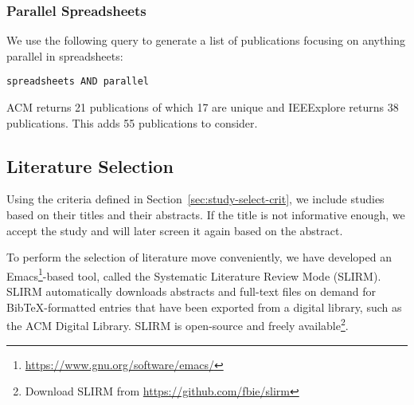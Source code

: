 \documentclass[a4paper]{article}
\begin{document}
\subsubsection{Parallel Spreadsheets}

We use the following query to generate a list of publications focusing on anything parallel in spreadsheets:

\begin{lstlisting}
spreadsheets AND parallel
\end{lstlisting}

\noindent ACM returns 21 publications of which 17 are unique and IEEExplore returns 38 publications. This adds 55 publications to consider.

\subsection{Literature Selection}
\label{sec:literature-selection}

Using the criteria defined in Section~\ref{sec:study-select-crit}, we include studies based on their titles and their abstracts. If the title is not informative enough, we accept the study and will later screen it again based on the abstract.

To perform the selection of literature move conveniently, we have developed an Emacs\footnote{\url{https://www.gnu.org/software/emacs/}}-based tool, called the Systematic Literature Review Mode (SLIRM). SLIRM automatically downloads abstracts and full-text files on demand for BibTeX-formatted entries that have been exported from a digital library, such as the ACM Digital Library. SLIRM is open-source and freely available\footnote{Download SLIRM from
  \url{https://github.com/fbie/slirm}}.
\end{document}
